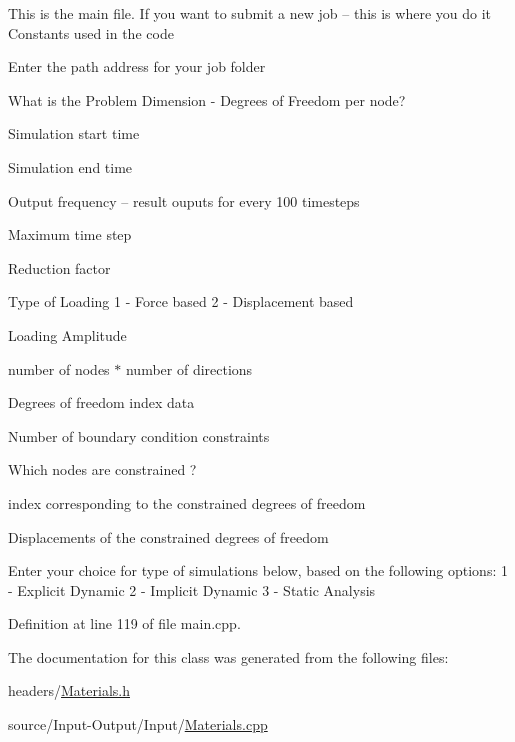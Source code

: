 This is the main file. If you want to submit a new job -- this is where you do it Constants used in the code

Enter the path address for your job folder

What is the Problem Dimension -\/ Degrees of Freedom per node?

Simulation start time

Simulation end time

Output frequency -- result ouputs for every 100 timesteps

Maximum time step

Reduction factor

Type of Loading 1 -\/ Force based 2 -\/ Displacement based

Loading Amplitude

number of nodes $\ast$ number of directions

Degrees of freedom index data

Number of boundary condition constraints

Which nodes are constrained ?

index corresponding to the constrained degrees of freedom

Displacements of the constrained degrees of freedom

Enter your choice for type of simulations below, based on the following options\+: 1 -\/ Explicit Dynamic 2 -\/ Implicit Dynamic 3 -\/ Static Analysis

Definition at line 119 of file main.\+cpp.



The documentation for this class was generated from the following files\+:\begin{DoxyCompactItemize}
\item 
headers/\hyperlink{_materials_8h}{Materials.\+h}\item 
source/\+Input-\/\+Output/\+Input/\hyperlink{_materials_8cpp}{Materials.\+cpp}\end{DoxyCompactItemize}
